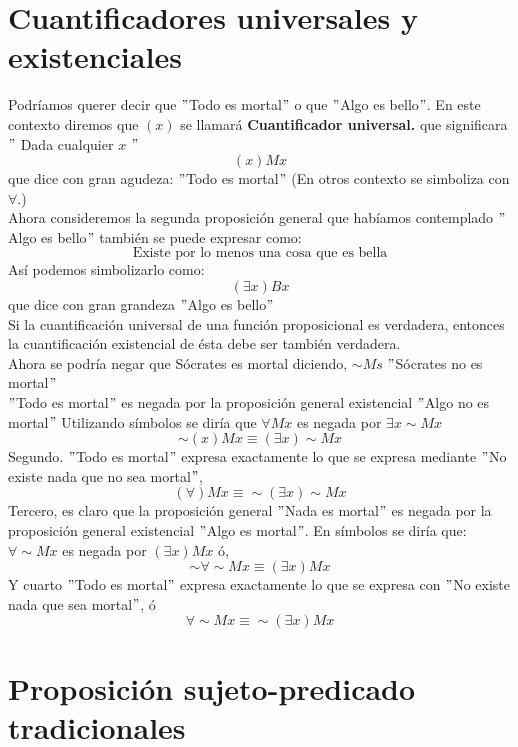 \documentclass[10pt]{book} 						%
\begin{document}
\section{Cuantificadores universales y existenciales}
Podríamos querer decir que $"$Todo es mortal$"$ o que $"$Algo es bello$"$. En este contexto diremos que $(x)$ se llamará \textbf{Cuantificador universal.} que significara $"$ Dada cualquier $x$ $"$
$$(x) Mx$$ que dice con gran agudeza: $"$Todo es mortal$"$ (En otros contexto se simboliza con $\forall$.)\\
 Ahora consideremos la segunda proposición general que habíamos contemplado $"$Algo es bello$"$ también se puede expresar como: 
 $$\mbox{Existe por lo menos una cosa que es bella}$$
Así podemos simbolizarlo como: $$(\exists x) Bx$$
que dice con gran grandeza $"$Algo es bello$"$\\
Si la cuantificación universal de una función proposicional es verdadera, entonces la cuantificación existencial de ésta debe ser también verdadera.\\
Ahora se podría negar que Sócrates es mortal diciendo, $\sim Ms$ $"$Sócrates no es mortal$"$\\
$"$Todo es mortal$"$ es negada por la proposición general existencial $"$Algo no es mortal$"$ Utilizando símbolos se diría que $\forall Mx$ es negada por $\exists x \sim Mx$
$$\sim (x) Mx \equiv (\exists x) \sim Mx$$
Segundo. $"$Todo es mortal$"$ expresa exactamente lo que se expresa mediante $"$No existe nada que no sea mortal$"$, $$(\forall)Mx \equiv \sim (\exists x)\sim Mx $$
Tercero, es claro que la proposición general $"$Nada es mortal$"$ es negada por la proposición general existencial $"$Algo es mortal$"$. En símbolos se diría que: $\forall \sim Mx$ es negada por $(\exists x) Mx$ ó,  $$\sim \forall \sim Mx \equiv (\exists x) Mx$$
Y cuarto $"$Todo es mortal$"$ expresa exactamente lo que se expresa con $"$No existe nada que sea mortal$"$, ó $$\forall \sim Mx \equiv \sim (\exists x) Mx$$
\section{Proposición sujeto-predicado tradicionales}
\end{document}
